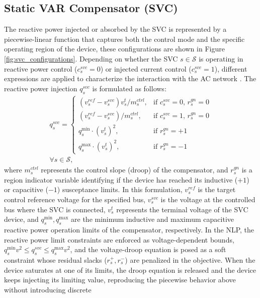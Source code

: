 \documentclass[letterpaper,journal]{IEEEtran}
\begin{document}
\subsection{Static VAR Compensator (SVC)}
The reactive power injected or absorbed by the SVC is represented by a piecewise-linear function that captures both the control mode and the
specific operating region of the device, these configurations are shown in Figure \ref{fig:svc_configurations}. Depending on whether the
SVC $s \in \mathcal{S}$ is operating in reactive power control ($c^{svc}_{s}=0$) or injected current control ($c^{svc}_{s}=1$), different
expressions are applied to characterize the interaction with the AC network \cite{ref12}.
The reactive power injection $q^{svc}_s$ is formulated as follows:
\begin{gather}
	\label{eq:svc_logic}
	q^{svc}_s =
	\begin{cases}
		(v^{ref}_s - v^{svc}_s) v^t_s / m^{ctrl}_s, & \text{if } c^{svc}_{s} = 0, \, r^{gn}_s = 0 \\[1.5ex]
		(v^{ref}_s - v^{svc}_s) / m^{ctrl}_s,       & \text{if } c^{svc}_{s} = 1, \, r^{gn}_s = 0 \\[1.5ex]
		q^{\min}_s \cdot (v^t_s)^2,                 & \text{if } r^{gn}_s = +1                    \\[1.5ex]
		q^{\max}_s \cdot (v^t_s)^2,                 & \text{if } r^{gn}_s = -1
	\end{cases} \nonumber \\
	\forall s \in \mathcal{S},
\end{gather}
where $m^{ctrl}_s$ represents the control slope (droop) of the compensator, and $r^{gn}_s$ is a region indicator variable identifying if the
device has reached its inductive ($+1$) or capacitive ($-1$) susceptance limits. In this formulation, $v^{ref}_s$ is the target control reference
voltage for the specified bus, $v^{svc}_s$ is the voltage at the controlled bus where the SVC is connected, $v^t_s$ represents the terminal voltage
of the SVC device, and $q^{\min}_s, q^{\max}_s$ are the minimum inductive and maximum capacitive reactive power operation limits of the compensator,
respectively. In the NLP, the reactive power limit constraints are enforced as voltage-dependent bounds,
$q^{\min}_s v^2 \le q^{svc}_s \le q^{\max}_s v^2$, and the voltage-droop equation is posed as a soft constraint whose residual
slacks ($r^{+}_s, r^{-}_s$) are penalized in the objective. When the device saturates at one of its limits, the droop equation is
released and the device keeps injecting its limiting value, reproducing the piecewise behavior above without introducing discrete
\end{document}
